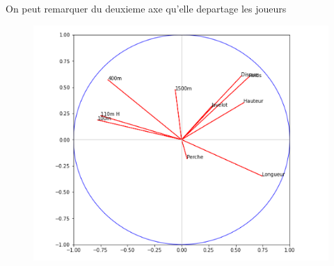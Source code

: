 \documentclass{article}
\begin{document}
On peut remarquer du deuxieme axe qu'elle departage les joueurs  

\begin{figure}[h!]
\includegraphics[width=\linewidth]{images/cercle_cor.png}
\end{figure}
\end{document}
